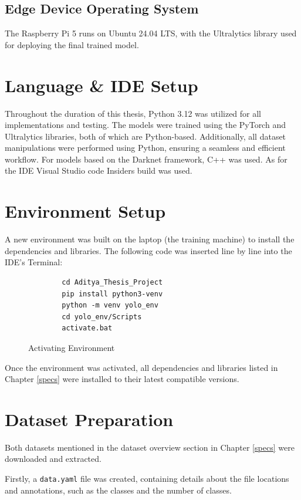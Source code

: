 \subsection{Edge Device Operating System}

The Raspberry Pi 5 runs on Ubuntu 24.04 LTS, with the Ultralytics library used for deploying the final trained model.

\section{Language \& IDE Setup}

Throughout the duration of this thesis, Python 3.12 was utilized for all implementations and testing. The models were trained using the PyTorch and Ultralytics libraries, both of which are Python-based. Additionally, all dataset manipulations were performed using Python, ensuring a seamless and efficient workflow. For models based on the Darknet framework, C++ was used. As for the IDE Visual Studio code Insiders build was used.


\section{Environment Setup}
A new environment was built on the laptop (the training machine) to install the dependencies and libraries. The following code was inserted line by line into the IDE's Terminal:
\begin{figure}
    \centering
    \begin{verbatim}
        cd Aditya_Thesis_Project
        pip install python3-venv
        python -m venv yolo_env
        cd yolo_env/Scripts
        activate.bat
    \end{verbatim}
    \caption{Activating Environment}
    \label{fig:ae}
\end{figure}


Once the environment was activated, all dependencies and libraries listed in Chapter \ref{specs} were installed to their latest compatible versions.

\section{Dataset Preparation}

Both datasets mentioned in the dataset overview section in Chapter \ref{specs} were downloaded and extracted.

Firstly, a \texttt{data.yaml} file was created, containing details about the file locations and annotations, such as the classes and the number of classes. 


